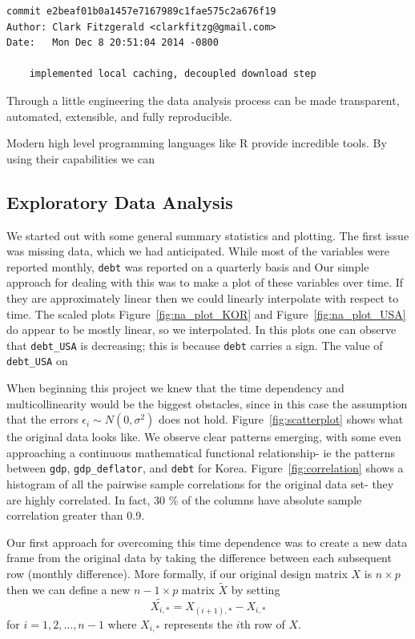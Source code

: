 \documentclass[12pt]{article}
\begin{document}
\begin{verbatim}
commit e2beaf01b0a1457e7167989c1fae575c2a676f19
Author: Clark Fitzgerald <clarkfitzg@gmail.com>
Date:   Mon Dec 8 20:51:04 2014 -0800

    implemented local caching, decoupled download step
\end{verbatim}

Through a little engineering the data analysis process
can be made transparent, automated, extensible, and fully reproducible.

Modern high level programming languages like R provide incredible tools. By
using their capabilities we can 

\subsection{Exploratory Data Analysis}

We started out with some general summary statistics and plotting. The first
issue was missing data, which we had anticipated. While most of the
variables were reported monthly, \texttt{debt} was reported on a quarterly
basis and 
Our simple approach for dealing with this was to
make a plot of these variables over time.
If they are approximately linear then we could 
linearly interpolate with respect to time. The scaled plots 
Figure~\ref{fig:na_plot_KOR} and
Figure~\ref{fig:na_plot_USA} do appear to be mostly linear, so we interpolated. 
In this plots one can observe that \texttt{debt\_USA} is decreasing; this is
because \texttt{debt} carries a sign. The value of \texttt{debt\_USA} on 

When beginning this project we knew that the time dependency and
multicollinearity would be the
biggest obstacles, since in this case the assumption that the errors
$\epsilon_i \sim N(0, \sigma^2)$ does not hold.
Figure~\ref{fig:scatterplot} shows what the original data looks like.
We observe clear patterns emerging, with some even approaching a
continuous mathematical functional relationship- ie the patterns
between \texttt{gdp}, \texttt{gdp\_deflator}, and \texttt{debt} for Korea.
Figure~\ref{fig:correlation} shows a histogram of all the pairwise sample
correlations for the original data set- they are highly correlated. In
fact, 30 \% of the columns have absolute sample correlation greater than 0.9.

Our first approach for overcoming this time dependence was to create a new
data frame from the original data by taking the difference between each
subsequent row (monthly difference). 
More formally, if our original design matrix $X$ is $n
\times p$ then we can define a new $n - 1 \times p$ matrix $\tilde{X}$ by
setting
\[
    \tilde{X_{i,*}} = X_{(i + 1), *} - X_{i, *}
\]
for $i = 1, 2, \dots, n-1$ where $X_{i, *}$ represents the $i$th row of
$X$.
\end{document}
